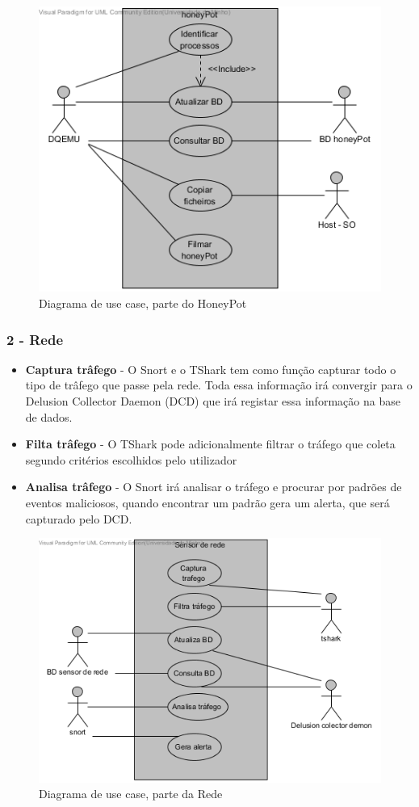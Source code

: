 \begin{figure}[!ht]
	\centering
	\includegraphics[scale=0.80]{images/ucs/HoneyPot}
	\caption {Diagrama de use case, parte do HoneyPot}
\end{figure}
\pagebreak

\subsubsection{\textbf{2 - Rede}}
\begin{itemize}
 \item \textbf{Captura trâfego} - O Snort e o TShark tem como função capturar todo o tipo de trâfego que passe pela rede. Toda essa informação
 irá convergir para o Delusion Collector Daemon (DCD) que irá registar essa informação na base de dados.
 \item \textbf{Filta trâfego} - O TShark pode adicionalmente filtrar o tráfego que coleta segundo critérios escolhidos pelo utilizador
 \item \textbf{Analisa trâfego} - O Snort irá analisar o tráfego e procurar por padrões de eventos maliciosos, quando encontrar um padrão gera um
 alerta, que será capturado pelo DCD.
 \end{itemize}

\begin{figure}[!ht]
	\centering
	\includegraphics[scale=0.80]{images/ucs/Rede}
	\caption {Diagrama de use case, parte da Rede}
\end{figure}
\pagebreak

